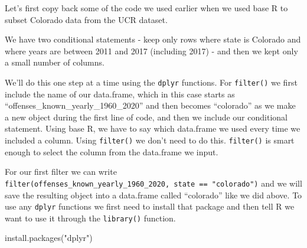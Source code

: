 \documentclass[
]{krantz}
\makeatletter
\newenvironment{Shaded}{\begin{snugshade}}{\end{snugshade}}
\newcommand{\DecValTok}[1]{\textcolor[rgb]{0.06,0.06,0.06}{#1}}
\newcommand{\FunctionTok}[1]{\textcolor[rgb]{0,0,0}{#1}}
\newcommand{\NormalTok}[1]{#1}
\newcommand{\OtherTok}[1]{\textcolor[rgb]{0.37,0.37,0.37}{#1}}
\newcommand{\SpecialCharTok}[1]{\textcolor[rgb]{0,0,0}{#1}}
\newcommand{\StringTok}[1]{\textcolor[rgb]{0.5,0.5,0.5}{#1}}
\newenvironment{kframe}{%
\medskip{}
\setlength{\fboxsep}{.8em}
 \def\at@end@of@kframe{}%
 \ifinner\ifhmode%
  \def\at@end@of@kframe{\end{minipage}}%
  \begin{minipage}{\columnwidth}%
 \fi\fi%
 \def\FrameCommand##1{\hskip\@totalleftmargin \hskip-\fboxsep
 \colorbox{shadecolor}{##1}\hskip-\fboxsep
     \hskip-\linewidth \hskip-\@totalleftmargin \hskip\columnwidth}%
 \MakeFramed {\advance\hsize-\width
   \@totalleftmargin\z@ \linewidth\hsize
   \@setminipage}}%
 {\par\unskip\endMakeFramed%
 \at@end@of@kframe}
\renewenvironment{Shaded}{\begin{kframe}}{\end{kframe}}
\makeatother
\begin{document}
Let's first copy back some of the code we used earlier when we used base R to subset Colorado data from the UCR dataset.

\begin{Shaded}
\end{Shaded}

We have two conditional statements - keep only rows where state is Colorado and where years are between 2011 and 2017 (including 2017) - and then we kept only a small number of columns.

We'll do this one step at a time using the \texttt{dplyr} functions. For \texttt{filter()} we first include the name of our data.frame, which in this case starts as ``offenses\_known\_yearly\_1960\_2020'' and then becomes ``colorado'' as we make a new object during the first line of code, and then we include our conditional statement. Using base R, we have to say which data.frame we used every time we included a column. Using \texttt{filter()} we don't need to do this. \texttt{filter()} is smart enough to select the column from the data.frame we input.

For our first filter we can write \texttt{filter(offenses\_known\_yearly\_1960\_2020,\ state\ ==\ "colorado")} and we will save the resulting object into a data.frame called ``colorado'' like we did above. To use any \texttt{dplyr} functions we first need to install that package and then tell R we want to use it through the \texttt{library()} function.

\begin{Shaded}
\begin{Highlighting}[]
\FunctionTok{install.packages}\NormalTok{(}\StringTok{"dplyr"}\NormalTok{)}
\end{Highlighting}
\end{Shaded}
\end{document}
